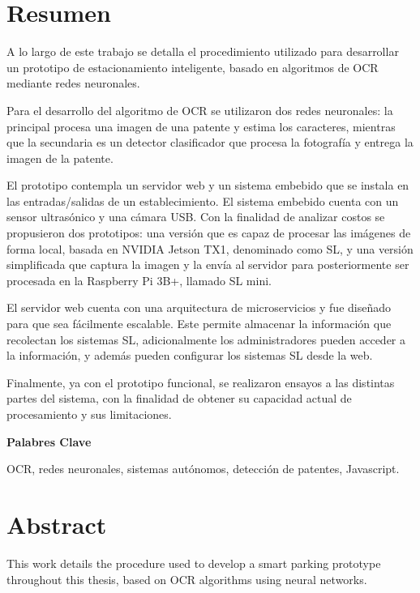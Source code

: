 \chapter*{Resumen}

A lo largo de este trabajo se detalla el procedimiento utilizado para desarrollar un prototipo de estacionamiento inteligente, basado en algoritmos de OCR mediante redes neuronales.

Para el desarrollo del algoritmo de OCR se utilizaron dos redes neuronales: la principal procesa una imagen de una patente y estima los caracteres,
mientras que la secundaria es un detector clasificador que procesa la fotografía y entrega la imagen de la patente.

El prototipo contempla un servidor web y un sistema embebido que se instala en las entradas/salidas de un establecimiento.
El sistema embebido cuenta con un sensor ultrasónico y una cámara USB.
Con la finalidad de analizar costos se propusieron dos prototipos: una versión que es capaz de procesar las imágenes de forma local, basada en NVIDIA Jetson TX1, denominado como SL, y una versión simplificada que captura la imagen y la envía al servidor para posteriormente ser procesada en la Raspberry Pi 3B+, llamado SL mini.

El servidor web cuenta con una arquitectura de microservicios y fue diseñado para que sea fácilmente escalable. Este permite almacenar la información que recolectan los sistemas SL, adicionalmente los administradores pueden acceder a la información, y además pueden configurar los sistemas SL desde la web.

Finalmente, ya con el prototipo funcional, se realizaron ensayos a las distintas partes del sistema, con la finalidad de obtener su capacidad actual de procesamiento y sus limitaciones.

\vspace*{\fill}
\noindent \textbf{Palabres Clave}

OCR, redes neuronales, sistemas autónomos, detección de patentes, Javascript.

\chapter*{Abstract}

This work details the procedure used to develop a smart parking prototype throughout this thesis, based on OCR algorithms using neural networks.


